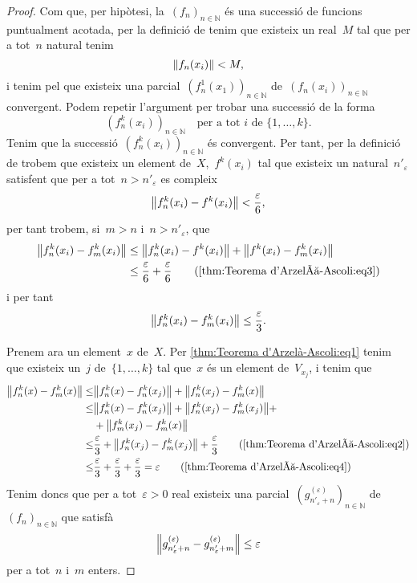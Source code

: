 \documentclass[../../main.tex]{subfiles}
\begin{document}
\begin{lemma}
\begin{proof}
			Com que, per hipòtesi, la~\((f_{n})_{n\in\mathbb{N}}\) és una successió de funcions puntualment acotada, per la definició de  tenim que existeix un real~\(M\) tal que per a tot~\(n\) natural tenim
			\[
			    \norm{f_{n}(x_{i})}<M,
			\]
			i tenim pel  que existeix una parcial~\((f_{n}^{1}(x_{1}))_{n\in\mathbb{N}}\) de~\((f_{n}(x_{i}))_{n\in\mathbb{N}}\) convergent.
			Podem repetir l'argument per trobar una successió de la forma
			\[
			    (f^{k}_{n}(x_{i}))_{n\in\mathbb{N}}\quad\text{per a tot }i\text{ de }\{1,\dots,k\}.
			\]
			Tenim que la successió~\((f^{k}_{n}(x_{i}))_{n\in\mathbb{N}}\) és convergent.
			Per tant, per la definició de  trobem que existeix un element de~\(X\),~\(f^{k}(x_{i})\) tal que existeix un natural~\(n'_{\varepsilon}\) satisfent que per a tot~\(n>n'_{\varepsilon}\) es compleix
			\begin{equation}
				\label{thm:Teorema d'Arzelà-Ascoli:eq3}
				\norm{f^{k}_{n}(x_{i})-f^{k}(x_{i})}<\frac{\varepsilon}{6},
			\end{equation}
			per tant trobem, si~\(m>n\) i~\(n>n'_{\varepsilon}\), que
			\begin{align*}
				\norm{f^{k}_{n}(x_{i})-f^{k}_{m}(x_{i})}&\leq\norm{f^{k}_{n}(x_{i})-f^{k}(x_{i})}+\norm{f^{k}(x_{i})-f^{k}_{m}(x_{i})} \\
				&\leq\frac{\varepsilon}{6}+\frac{\varepsilon}{6} \tag{\ref{thm:Teorema d'Arzelà-Ascoli:eq3}}
			\end{align*}
			i per tant
			\begin{equation}
				\label{thm:Teorema d'Arzelà-Ascoli:eq4}
				\norm{f^{k}_{n}(x_{i})-f^{k}_{m}(x_{i})}\leq\frac{\varepsilon}{3}.
			\end{equation}

			Prenem ara un element~\(x\) de~\(X\).
			Per \eqref{thm:Teorema d'Arzelà-Ascoli:eq1} tenim que existeix un~\(j\) de~\(\{1,\dots,k\}\) tal que~\(x\) és un element de~\(V_{x_{j}}\), i tenim que
			\begin{align*}
				\norm{f^{k}_{n}(x)-f^{k}_{m}(x)}\leq&\norm{f^{k}_{n}(x)-f^{k}_{n}(x_{j})}+\norm{f^{k}_{n}(x_{j})-f^{k}_{m}(x)} \\
				\leq&\norm{f^{k}_{n}(x)-f^{k}_{n}(x_{j})}+\norm{f^{k}_{n}(x_{j})-f^{k}_{m}(x_{j})}+\\&+\norm{f^{k}_{m}(x_{j})-f^{k}_{m}(x)} \\
				\leq&\frac{\varepsilon}{3}+\norm{f^{k}_{n}(x_{j})-f^{k}_{m}(x_{j})}+\frac{\varepsilon}{3}\tag{\ref{thm:Teorema d'Arzelà-Ascoli:eq2}} \\
				\leq&\frac{\varepsilon}{3}+\frac{\varepsilon}{3}+\frac{\varepsilon}{3}=\varepsilon\tag{\ref{thm:Teorema d'Arzelà-Ascoli:eq4}}
			\end{align*}
			Tenim doncs que per a tot~\(\varepsilon>0\) real existeix una parcial~\((g^{(\varepsilon)}_{n'_{\varepsilon}+n})_{n\in\mathbb{N}}\) de~\((f_{n})_{n\in\mathbb{N}}\) que satisfà
			\[
			    \norm{g^{(\varepsilon)}_{n'_{\varepsilon}+n}-g^{(\varepsilon)}_{n'_{\varepsilon}+m}}\leq\varepsilon
			\]
			per a tot~\(n\) i~\(m\) enters.


\end{proof}
\end{lemma}
\end{document}
